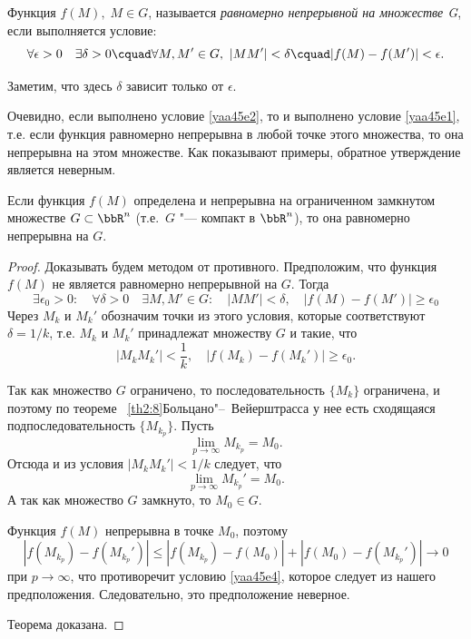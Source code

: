\begin{defn}
Функция $f(M),\; M\in G$, называется \textit{равномерно непрерывной на множестве G}, если выполняется условие:
\begin{equation}\label{yaa45e2}
\forall\epsilon>0\quad\exists\delta>0\cquad\forall M, M'\in G,\ |MM'|<\delta\cquad |f(M)-f(M')|<\epsilon.
\end{equation}
\end{defn}
Заметим, что здесь $\delta$ зависит только от $\epsilon$.

Очевидно, если выполнено условие \eqref{yaa45e2}, то и выполнено условие \eqref{yaa45e1}, т.е. если функция равномерно непрерывна в любой точке этого множества, то она непрерывна на этом множестве. Как показывают примеры, обратное утверждение является неверным.


\begin{thm}  \label{th:ch2:Kantor}
Если функция $f(M)$ определена и непрерывна на ограниченном замкнутом множестве $G\subset\bbR^n$ (т.е.~$G$ "--- компакт в $\bbR^n$), то она равномерно непрерывна на $G$.
\end{thm}

\begin{proof}
Доказывать будем методом от противного. Предположим, что функция $f(M)$ не является равномерно непрерывной на $G$. Тогда
$$
\exists\epsilon_0>0:\quad\forall\delta>0\quad\exists M,M'\in G:\quad |MM'|<\delta, \quad |f(M)-f(M')|\ge \epsilon_0
$$
Через $M_k$ и $M_k'$ обозначим точки из этого условия, которые соответствуют $\delta=1/k$, т.е. $M_k$ и $M_k'$ принадлежат множеству $G$ и такие, что 
\begin{equation}\label{yaa45e4}
|M_kM_k'|<\frac{1}{k},\quad|f(M_k)-f(M_k')|\ge \epsilon_0.
\end{equation}

Так как множество $G$ ограничено, то последовательность $\{M_k\}$ ограничена, и поэтому по теореме ~\ref{th2:8}{Больцано"--~Вейерштрасса} у нее есть сходящаяся подпоследовательность $\{M_{k_p}\}$. Пусть
$$
\lim\limits_{p\to\infty} M_{k_p} =M_0.
$$
Отсюда и из условия $|M_kM_k'|<1/k$ следует, что 
$$
\lim\limits_{p\to\infty} M_{k_p}' =M_0.
$$
А так как множество $G$ замкнуто, то $M_0 \in G$.

Функция $f(M)$ непрерывна в точке $M_0$, поэтому
$$
|f(M_{k_p})-f(M_{k_p}')|\le |f(M_{k_p})-f(M_0)|+|f(M_0)-f(M_{k_p}')|\to 0
$$
при $p\to\infty$, что противоречит условию \eqref{yaa45e4}, которое следует из нашего предположения. Следовательно, это предположение неверное. 

Теорема доказана.
\end{proof}


